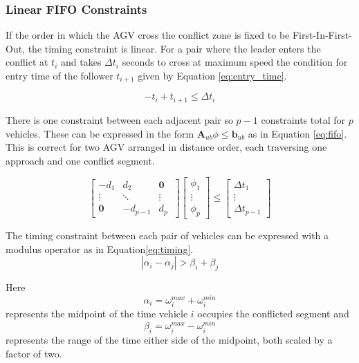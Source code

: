 \subsubsection{Linear FIFO Constraints}
\label{sec:fifo_constraints}
If the order in which the AGV cross the conflict zone is fixed to be First-In-First-Out, the timing constraint is linear. For a pair where the leader enters the conflict at $t_i$ and takes $\Delta t_i$ seconds to cross at maximum speed the condition for entry time of the follower $t_{i+1}$ given by Equation \ref{eq:entry_time}.

\begin{equation}
	-t_{i} + t_{i+1}	\leq	\Delta t_i
	\label{eq:entry_time} 
\end{equation} 

There is one constraint between each adjacent pair so $p-1$ constraints total for $p$ vehicles. These can be expressed in the form $\bm{A}_{ub}\phi \leq \bm{b}_{ub}$ as in Equation \ref{eq:fifo}. This is correct for two AGV arranged in distance order, each traversing one approach and one conflict segment. 



\begin{equation}
\left[ 
\begin{array}{ccccc}
-d_1 & d_2 & \bm{0}\\
\vdots & \ddots & \vdots \\
\bm{0} & -d_{p-1} & d_p\
\end{array} \right]
\left[
 \begin{array}{c}
  \phi_1 \\ \vdots \\ \phi_p
 \end{array} \right]
\leq
\left[ 
\begin{array}{c}
\Delta t_1 \\
 \vdots \\
 \Delta t_{p-1}
\end{array} \right]
\label{eq:fifo}
\end{equation}

 The timing constraint between each pair of vehicles can be expressed with a modulus operator as in Equation\ref{eq:timing}.
\begin{equation}
|\alpha_i - \alpha_j| > \beta_i + \beta_j
\label{eq:timing}
\end{equation}

Here 
\begin{equation}
\alpha_i  = \omega_i^{max} + \omega_i^{min}
\label{eq:alpha}
\end{equation}
represents the midpoint of the time vehicle $i$ occupies the conflicted segment and
\begin{equation}
\beta_i  = \omega_i^{max} - \omega_i^{min}
\label{eq:beta}
\end{equation}
represents the range of the time either side of the midpoint, both scaled by a factor of two. 


